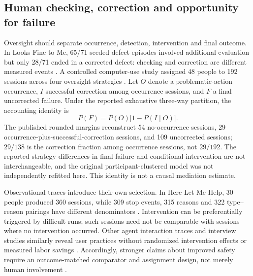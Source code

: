 \subsection{Human checking, correction and opportunity for failure}\label{sec:human}
Oversight should separate occurrence, detection, intervention and final outcome. In Looks Fine to Me, 65/71 seeded-defect episodes involved additional evaluation but only 28/71 ended in a corrected defect: checking and correction are different measured events \cite{ref10}. A controlled computer-use study assigned 48 people to 192 sessions across four oversight strategies \cite{ref16}. Let $O$ denote a problematic-action occurrence, $I$ successful correction among occurrence sessions, and $F$ a final uncorrected failure. Under the reported exhaustive three-way partition, the accounting identity is
\begin{equation}\label{eq:failure}
P(F)=P(O)\bigl[1-P(I\mid O)\bigr].
\end{equation}
The published rounded margins reconstruct 54 no-occurrence sessions, 29 occurrence-plus-successful-correction sessions, and 109 uncorrected sessions; $29/138$ is the correction fraction among occurrence sessions, not $29/192$. The reported strategy differences in final failure and conditional intervention are not interchangeable, and the original participant-clustered model was not independently refitted here. This identity is not a causal mediation estimate.

Observational traces introduce their own selection. In Here Let Me Help, 30 people produced 360 sessions, while 309 stop events, 315 reasons and 322 type--reason pairings have different denominators \cite{ref11}. Intervention can be preferentially triggered by difficult runs; such sessions need not be comparable with sessions where no intervention occurred. Other agent interaction traces and interview studies similarly reveal user practices without randomized intervention effects or measured labor savings \cite{ref27,ref29,ref30}. Accordingly, stronger claims about improved safety require an outcome-matched comparator and assignment design, not merely human involvement \cite{ref19}.

